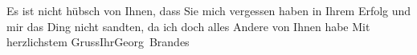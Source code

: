 \pstart
           Es ist nicht hübsch von Ihnen, dass Sie mich vergessen haben in Ihrem Erfolg und
                  mir das Ding nicht
               sandten, da ich doch alles Andere von Ihnen habe\pend
           \pstart Mit herzlichstem Gruss\hspace*{3.5em}Ihr\hspace*{3.5em}\spacefill\mbox{Georg Brandes}\pend{}\endnumbering{}  \newcommand{\dateiname}{L00541}\newcommand{\titel}{Georg Brandes an Arthur Schnitzler, 22. 4. 1896}\newcommand{\editorInnen}{Martin Anton Müller und Gerd-Hermann Susen}
